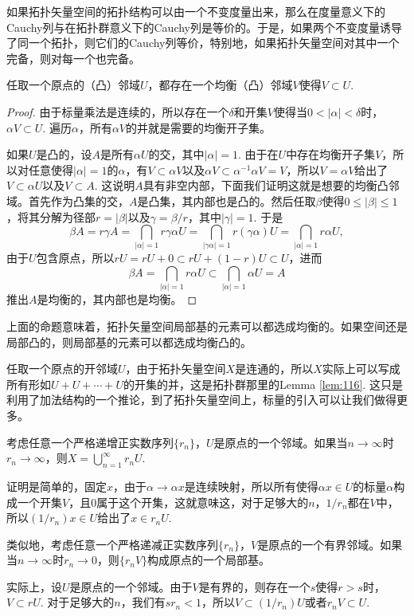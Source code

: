 如果拓扑矢量空间的拓扑结构可以由一个不变度量出来，那么在度量意义下的Cauchy列与在拓扑群意义下的Cauchy列是等价的。于是，如果两个不变度量诱导了同一个拓扑，则它们的Cauchy列等价，特别地，如果拓扑矢量空间对其中一个完备，则对每一个也完备。

\begin{pro}
任取一个原点的（凸）邻域$U$，都存在一个均衡（凸）邻域$V$使得$V\subset U$. 
\end{pro}

\begin{proof}
	由于标量乘法是连续的，所以存在一个$\delta$和开集$V$使得当$0<|\alpha|<\delta$时，$\alpha V\subset U$. 遍历$\alpha$，所有$\alpha V$的并就是需要的均衡开子集。

	如果$U$是凸的，设$A$是所有$\alpha U$的交，其中$|\alpha|=1$. 由于在$U$中存在均衡开子集$V$，所以对任意使得$|\alpha|=1$的$\alpha$，有$V\subset \alpha V$以及$\alpha V\subset \alpha^{-1}\alpha V=V$，所以$V=\alpha V$给出了$V\subset \alpha U$以及$V\subset A$. 这说明$A$具有非空内部，下面我们证明这就是想要的均衡凸邻域。首先作为凸集的交，$A$是凸集，其内部也是凸的。然后任取$\beta$使得$0\leq |\beta|\leq 1$，将其分解为径部$r=|\beta|$以及$\gamma=\beta/r$，其中$|\gamma|=1$. 于是
	\[
	\beta A=r\gamma A=\bigcap_{|\alpha|=1}r\gamma\alpha U=\bigcap_{|\gamma\alpha|=1}r(\gamma\alpha) U=\bigcap_{|\alpha|=1}r\alpha U,
	\]
	由于$U$包含原点，所以$rU=rU+0\subset rU+(1-r)U\subset U$，进而
	\[
	\beta A=\bigcap_{|\alpha|=1}r\alpha U\subset \bigcap_{|\alpha|=1}\alpha U=A
	\]
	推出$A$是均衡的，其内部也是均衡。
\end{proof}

上面的命题意味着，拓扑矢量空间局部基的元素可以都选成均衡的。如果空间还是局部凸的，则局部基的元素可以都选成均衡凸的。

\begin{para}
任取一个原点的开邻域$U$，由于拓扑矢量空间$X$是连通的，所以$X$实际上可以写成所有形如$U+U+\cdots+U$的开集的并，这是拓扑群那里的Lemma \ref{lem:116}. 这只是利用了加法结构的一个推论，到了拓扑矢量空间上，标量的引入可以让我们做得更多。
\begin{compactenum}
\item 考虑任意一个严格递增正实数序列$\{r_n\}$，$U$是原点的一个邻域。如果当$n\to \infty$时$r_n\to \infty$，则$X=\bigcup_{n=1}^\infty r_n U$.

证明是简单的，固定$x$，由于$\alpha\to \alpha x$是连续映射，所以所有使得$\alpha x\in U$的标量$\alpha$构成一个开集$V$，且$0$属于这个开集，这就意味这，对于足够大的$n$，$1/r_n$都在$V$中，所以$(1/r_n) x\in U$给出了$x\in r_n U$.

\item 类似地，考虑任意一个严格递减正实数序列$\{r_n\}$，$V$是原点的一个有界邻域。如果当$n\to \infty$时$r_n\to 0$，则$\{r_n V\}$构成原点的一个局部基。

实际上，设$U$是原点的一个邻域。由于$V$是有界的，则存在一个$s$使得$r>s$时，$V\subset rU$. 对于足够大的$n$，我们有$sr_n<1$，所以$V\subset (1/r_n)U$或者$r_n V\subset U$.
\end{compactenum}
\end{para}

